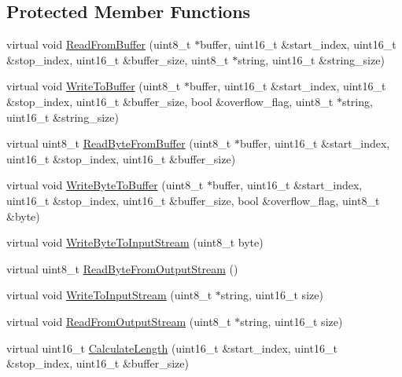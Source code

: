 \subsection*{Protected Member Functions}
\begin{DoxyCompactItemize}
\item 
virtual void \hyperlink{class_stream_add5927208d603b08341f8972652d9c44}{Read\-From\-Buffer} (uint8\-\_\-t $\ast$buffer, uint16\-\_\-t \&start\-\_\-index, uint16\-\_\-t \&stop\-\_\-index, uint16\-\_\-t \&buffer\-\_\-size, uint8\-\_\-t $\ast$string, uint16\-\_\-t \&string\-\_\-size)
\item 
virtual void \hyperlink{class_stream_a456d59b1944143a8e4a977b8861d42ea}{Write\-To\-Buffer} (uint8\-\_\-t $\ast$buffer, uint16\-\_\-t \&start\-\_\-index, uint16\-\_\-t \&stop\-\_\-index, uint16\-\_\-t \&buffer\-\_\-size, bool \&overflow\-\_\-flag, uint8\-\_\-t $\ast$string, uint16\-\_\-t \&string\-\_\-size)
\item 
virtual uint8\-\_\-t \hyperlink{class_stream_a6c49bb8565d238e13c3ca3e9eddcf38e}{Read\-Byte\-From\-Buffer} (uint8\-\_\-t $\ast$buffer, uint16\-\_\-t \&start\-\_\-index, uint16\-\_\-t \&stop\-\_\-index, uint16\-\_\-t \&buffer\-\_\-size)
\item 
virtual void \hyperlink{class_stream_a129f3c3e763ceab692bdde38fdc89402}{Write\-Byte\-To\-Buffer} (uint8\-\_\-t $\ast$buffer, uint16\-\_\-t \&start\-\_\-index, uint16\-\_\-t \&stop\-\_\-index, uint16\-\_\-t \&buffer\-\_\-size, bool \&overflow\-\_\-flag, uint8\-\_\-t \&byte)
\item 
virtual void \hyperlink{class_stream_a70108ab0e811c6cab2636bf7afeb5e14}{Write\-Byte\-To\-Input\-Stream} (uint8\-\_\-t byte)
\item 
virtual uint8\-\_\-t \hyperlink{class_stream_a712a8e0c6659799b1bb2999b53bd983d}{Read\-Byte\-From\-Output\-Stream} ()
\item 
virtual void \hyperlink{class_stream_aa2f020721d273ce821ccf626e5eb773c}{Write\-To\-Input\-Stream} (uint8\-\_\-t $\ast$string, uint16\-\_\-t size)
\item 
virtual void \hyperlink{class_stream_adce437b86a098710237ac7dcccd5508d}{Read\-From\-Output\-Stream} (uint8\-\_\-t $\ast$string, uint16\-\_\-t size)
\item 
virtual uint16\-\_\-t \hyperlink{class_stream_a8abdeaae6339d9873842a951843cb386}{Calculate\-Length} (uint16\-\_\-t \&start\-\_\-index, uint16\-\_\-t \&stop\-\_\-index, uint16\-\_\-t \&buffer\-\_\-size)
\end{DoxyCompactItemize}
